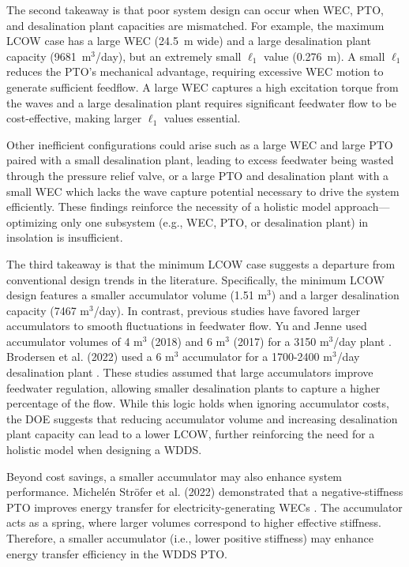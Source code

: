 \documentclass[twocolumn,10pt]{asme2e}
\begin{document}
The second takeaway is that poor system design can occur when WEC, PTO, and desalination plant capacities are mismatched. For example, the maximum LCOW case has a large WEC (24.5~m wide) and a large desalination plant capacity (9681~m$^3$/day), but an extremely small $\ell_1$ value (0.276~m). A small $\ell_1$ reduces the PTO's mechanical advantage, requiring excessive WEC motion to generate sufficient feedflow. A large WEC captures a high excitation torque from the waves and a large desalination plant requires significant feedwater flow to be cost-effective, making larger $\ell_1$ values essential. 

Other inefficient configurations could arise such as a large WEC and large PTO paired with a small desalination plant, leading to excess feedwater being wasted through the pressure relief valve, or a large PTO and desalination plant with a small WEC which lacks the wave capture potential necessary to drive the system efficiently. These findings reinforce the necessity of a holistic model approach---optimizing only one subsystem (e.g., WEC, PTO, or desalination plant) in insolation is insufficient.

The third takeaway is that the minimum LCOW case suggests a departure from conventional design trends in the literature. Specifically, the minimum LCOW design features a smaller accumulator volume (1.51 m$^3$) and a larger desalination capacity (7467 m$^3$/day). In contrast, previous studies have favored larger accumulators to smooth fluctuations in feedwater flow. Yu and Jenne used accumulator volumes of 4 m$^3$ (2018) and 6 m$^3$ (2017) for a 3150 m$^3$/day plant \cite{YJecon2017,Yu2018}. Brodersen et al. (2022) used a 6 m$^3$ accumulator for a 1700-2400 m$^3$/day desalination plant \cite{Brodersen2022}. These studies assumed that large accumulators improve feedwater regulation, allowing smaller desalination plants to capture a higher percentage of the flow. While this logic holds when ignoring accumulator costs, the DOE suggests that reducing accumulator volume and increasing desalination plant capacity can lead to a lower LCOW, further reinforcing the need for a holistic model when designing a WDDS.

Beyond cost savings, a smaller accumulator may also enhance system performance. Michelén Ströfer et al. (2022) demonstrated that a negative-stiffness PTO improves energy transfer for electricity-generating WECs  \cite{Stroefer2023}. The accumulator acts as a spring, where larger volumes correspond to higher effective stiffness. Therefore, a smaller accumulator (i.e., lower positive stiffness) may enhance energy transfer efficiency in the WDDS PTO.
\end{document}
